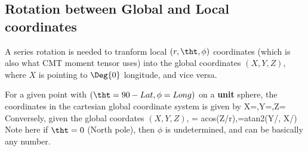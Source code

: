 \documentclass[12pt,titlepage,fleqn]{article}
\begin{document}
\subsection{Rotation between Global and Local coordinates}
A series rotation is needed to tranform local $(r,\tht,\phi)$ coordinates
(which is also what CMT moment tensor uses) into the global coordinates $(X,Y,Z)$, where $X$ is pointing to $\Deg{0}$ longitude, and vice versa.

For a given point with $(\tht=90-Lat,\phi=Long)$ on a \textbf{unit} sphere, the coordinates in the cartesian global coordinate system is given by
\eq
X=\sin\tht\cos\phi,\quad Y=\sin\tht\sin\phi,\quad Z=\cos\tht
\en
Conversely, given the global coordates $(X,Y,Z)$, 
\eq
\tht = acos(Z/r),\quad  \phi=atan2(Y/\sin\tht, X/\sin\tht)
\en
Note here if $\tht=0$ (North pole), then $\phi$ is undetermined, and can be basically any number.
\end{document}
